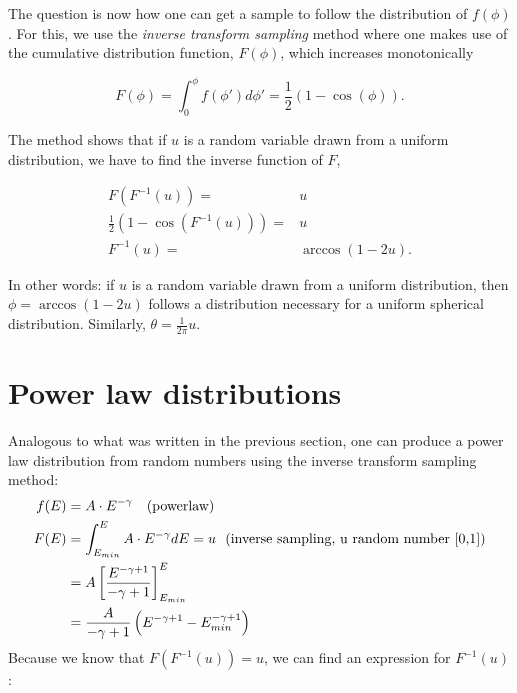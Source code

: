 \begin{appendices}
\noindent The question is now how one can get a sample to follow the distribution of $f(\phi)$. For this, we use the \textit{inverse transform sampling} method where one makes use of the cumulative distribution function, $F(\phi)$, which increases monotonically

\begin{equation}
F(\phi) = \int^\phi_0 f(\phi')d\phi' = \frac{1}{2} \left(1-\cos(\phi)\right).
\end{equation}

\noindent The method shows that if $u$ is a random variable drawn from a uniform distribution, we have to find the inverse function of $F$,

\begin{align}
F(F^{-1}(u)) =& u \\
\frac{1}{2} \left(1-\cos(F^{-1}(u))\right) =& u\\
F^{-1}(u) =& \arccos(1-2u).
\end{align}

\noindent In other words: if $u$ is a random variable drawn from a uniform distribution, then $\phi = \arccos(1-2u)$ follows a distribution necessary for a uniform spherical distribution. Similarly, $\theta = \frac{1}{2\pi} u$.
\section{Power law distributions}
\label{sec:powerlawdistr}
Analogous to what was written in the previous section, one can produce a power law distribution from random numbers using the inverse transform sampling method: 
\begin{equation}
\begin{split}
f(E) &= A\cdot E^{-\gamma} \rm\ \ \ (power law)\\
F(E) &= \int^{E}_{E_{min}} A \cdot E^{-\gamma} dE = u \text{\ \ (inverse sampling, u random number [0,1])}\\
&= A \left[\frac{E^{-\gamma+1}}{-\gamma+1}\right]^E_{E_{min}}\\
&= \frac{A}{-\gamma+1}\left(E^{-\gamma+1}-E_{min}^{-\gamma+1}\right)\\
\end{split}
\end{equation}
\vspace{3mm}
\noindent Because we know that $F\left(F^{-1}(u)\right) = u$, we can find an expression for $F^{-1}(u)$:


\end{appendices}
